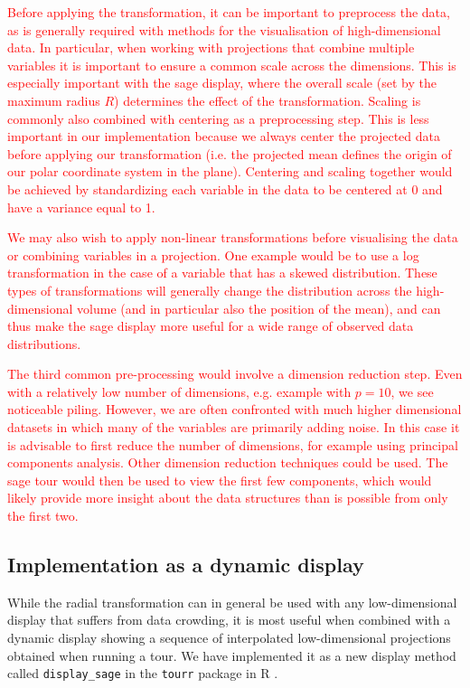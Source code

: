 \documentclass[]{interact}
\theoremstyle{plain}%
\theoremstyle{definition}
\theoremstyle{remark}
\begin{document}
\textcolor{red}{Before applying the transformation, it can be important to preprocess the data, as is generally required with methods for the visualisation of high-dimensional data. In particular, when working with projections that combine multiple variables it is important to ensure a common scale across the dimensions. This is especially important with the sage display, where the overall scale (set by the maximum radius $R$) determines the effect of the transformation. Scaling is commonly also combined with centering as a preprocessing step. This is less important in our implementation because we always center the projected data before applying our transformation (i.e. the projected mean defines the origin of our polar coordinate system in the plane). Centering and scaling together would be achieved by standardizing each variable in the data to be centered at 0 and have a variance equal to 1.}

\textcolor{red}{We may also wish to apply non-linear transformations before visualising the data or combining variables in a projection. One example would be to use a log transformation in the case of a variable that has a skewed distribution. These types of transformations will generally change the distribution across the high-dimensional volume (and in particular also the position of the mean), and can thus make the sage display more useful for a wide range of observed data distributions.}

\textcolor{red}{The third common pre-processing would involve a dimension reduction step. Even with a relatively low number of dimensions, e.g. example with $p=10$, we see noticeable piling. However, we are often confronted with much higher dimensional datasets in which many of the variables are primarily adding noise. In this case it is advisable to first reduce the number of dimensions, for example using principal components analysis. Other dimension reduction techniques could be used. The sage tour would then be used to view the first few components, which would likely provide more insight about the data structures than is possible from only the first two. }

\hypertarget{sec:implementation}{%
\subsection{Implementation as a dynamic
display}\label{sec:implementation}}

While the radial transformation can in general be used with any
low-dimensional display that suffers from data crowding, it is most
useful when combined with a dynamic display showing a sequence of
interpolated low-dimensional projections obtained when running a tour.
We have implemented it as a new display method called
\texttt{display\_sage} in the \texttt{tourr} package \citep{tourr} in R
\citep{rref}.
\end{document}
